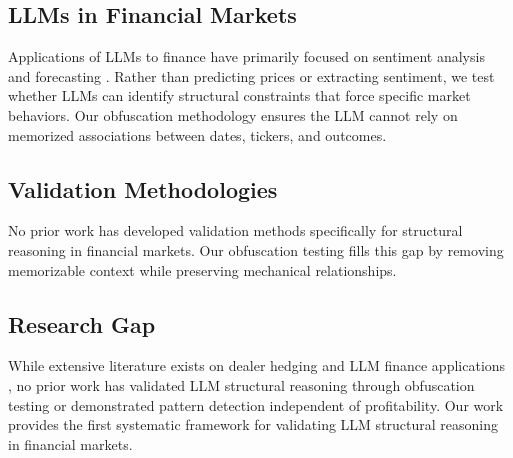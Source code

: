 \subsection{LLMs in Financial Markets}

Applications of LLMs to finance have primarily focused on sentiment analysis and forecasting \cite{lopez2023can,chen2023fingpt}. Rather than predicting prices or extracting sentiment, we test whether LLMs can identify structural constraints that force specific market behaviors. Our obfuscation methodology ensures the LLM cannot rely on memorized associations between dates, tickers, and outcomes.

\subsection{Validation Methodologies}

No prior work has developed validation methods specifically for structural reasoning in financial markets. Our obfuscation testing fills this gap by removing memorizable context while preserving mechanical relationships.

\subsection{Research Gap}

While extensive literature exists on dealer hedging \cite{ni2005stock,garleanu2009demand} and LLM finance applications \cite{lopez2023can,chen2023fingpt}, no prior work has validated LLM structural reasoning through obfuscation testing or demonstrated pattern detection independent of profitability. Our work provides the first systematic framework for validating LLM structural reasoning in financial markets.